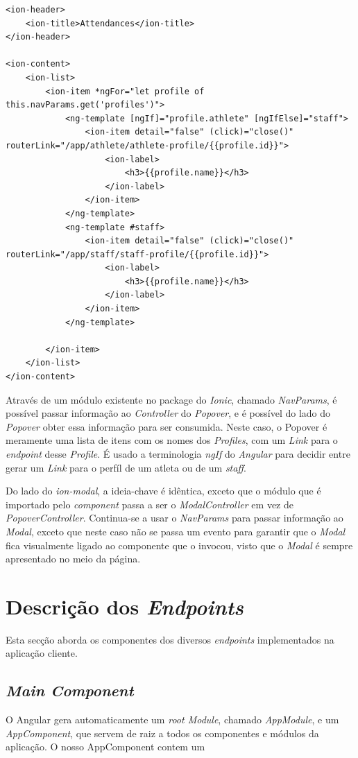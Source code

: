 \begin{lstlisting}
<ion-header>
	<ion-title>Attendances</ion-title>
</ion-header>

<ion-content>
	<ion-list>
		<ion-item *ngFor="let profile of this.navParams.get('profiles')">
			<ng-template [ngIf]="profile.athlete" [ngIfElse]="staff">
				<ion-item detail="false" (click)="close()" routerLink="/app/athlete/athlete-profile/{{profile.id}}">
					<ion-label>
						<h3>{{profile.name}}</h3>
					</ion-label>
				</ion-item>
			</ng-template>
			<ng-template #staff>
				<ion-item detail="false" (click)="close()" routerLink="/app/staff/staff-profile/{{profile.id}}">
					<ion-label>
						<h3>{{profile.name}}</h3>
					</ion-label>
				</ion-item>
			</ng-template>
		
		</ion-item>
	</ion-list>
</ion-content>
\end{lstlisting}

Através de um módulo existente no package do \textit{Ionic}, chamado \textit{NavParams}, é possível passar informação ao \textit{Controller} do \textit{Popover}, e é possível do lado do \textit{Popover} obter essa informação para ser consumida. Neste caso, o Popover é meramente uma lista de itens com os nomes dos \textit{Profiles}, com um \textit{Link} para o \textit{endpoint} desse \textit{Profile}. É usado a terminologia \textit{ngIf} do \textit{Angular} para decidir entre gerar um \textit{Link} para o perfíl de um atleta ou de um \textit{staff}.

Do lado do \textit{ion-modal}, a ideia-chave é idêntica, exceto que o módulo que é importado pelo \textit{component} passa a ser o \textit{ModalController} em vez de \textit{PopoverController}. Continua-se a usar o \textit{NavParams} para passar informação ao \textit{Modal}, exceto que neste caso não se passa um evento para garantir que o \textit{Modal} fica visualmente ligado ao componente que o invocou, visto que o \textit{Modal} é sempre apresentado no meio da página.

\section{Descrição dos \textit{Endpoints}}\label{sec42}

Esta secção aborda os componentes dos diversos \textit{endpoints} implementados na aplicação cliente.


\subsection{\textit{Main Component}}\label{subsec421}

O Angular gera automaticamente um \textit{root Module}, chamado \textit{AppModule}, e um \textit{AppComponent}, que servem de raiz a todos os componentes e módulos da aplicação. O nosso AppComponent contem um 